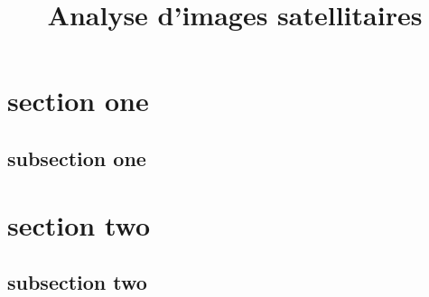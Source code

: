 \documentclass{beamer}
\author[My Name]{}
\institute[Lab Name]{ complete lab name }
\title[]{Analyse d’images satellitaires }
\begin{document}
 {
 \begin{frame}
 \titlepage
 \end{frame}
 }


 \section{section one}
  \subsection{subsection one}
 \begin{frame}



 \end{frame}


  \section{section two}
     \subsection{subsection two}
  \begin{frame}

  \end{frame}
\end{document}
